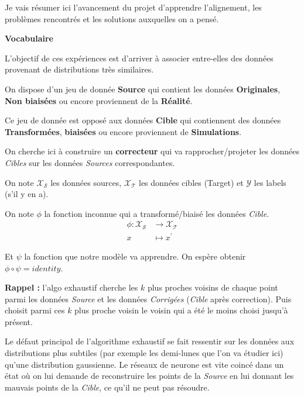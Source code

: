 
\label{day:21-04-2016}

Je vais résumer ici l'avancement du projet d'apprendre l'alignement,
les problèmes rencontrés et les solutions auxquelles on a pensé.

{\Large \textbf{Vocabulaire}}

L'objectif de ces expériences est d'arriver à associer entre-elles des données
provenant de distributions très similaires.

On dispose d'un jeu de donnée \textbf{Source} qui contient les données 
\textbf{Originales}, \textbf{Non biaisées} ou encore proviennent de
la \textbf{Réalité}.

Ce jeu de donnée est opposé aux données \textbf{Cible} qui contiennent des
données \textbf{Transformées}, \textbf{biaisées} ou encore proviennent de
\textbf{Simulations}.

On cherche ici à construire un \textbf{correcteur} qui va rapprocher/projeter
les données \emph{Cibles} sur les données \emph{Sources} correspondantes.

On note $\mathcal{X_S}$ les données sources, $\mathcal{X_T}$ les données 
cibles (Target) et $\mathcal{Y}$ les labels (s'il y en a).

On note $\phi$ la fonction inconnue qui a transformé/biaisé les données \emph{Cible}.
\begin{align*}
\phi : \mathcal{X_S}  &\to \mathcal{X_T} \\
                  x &\mapsto x^\prime
\end{align*}

Et $\psi$ la fonction que notre modèle va apprendre. On espère obtenir
$\phi \circ \psi = identity$.



\textbf{\large Rappel :} l'algo exhaustif cherche les $k$ plus proches voisins
de chaque point parmi les données \emph{Source} et les données 
\emph{Corrigées} (\emph{Cible} après correction). Puis choisit parmi ces $k$ 
plus proche voisin le voisin qui a été le moins choisi jusqu'à présent.

Le défaut principal de l'algorithme exhaustif se fait ressentir sur les données
aux distributions plus subtiles (par exemple les demi-lunes que l'on va étudier ici) 
qu'une distribution gaussienne. Le réseaux de neurone est vite coincé dans un
état où on lui demande de reconstruire les points de la \emph{Source} en lui 
donnant les mauvais points de la \emph{Cible}, ce qu'il ne peut pas résoudre.

